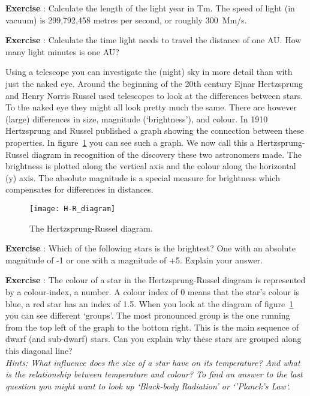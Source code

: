 \begin{shaded}
\textbf{Exercise \theExercise {}} : Calculate the length of the light year in Tm. The speed of light (in vacuum) is 299,792,458 metres per second, or roughly 300~Mm/s.\end{shaded}
\begin{shaded}
\textbf{Exercise \theExercise {}} : Calculate the time light needs to travel the distance of one AU. How many light minutes is one AU?\end{shaded}

Using a telescope you can investigate the (night) sky in more detail than with just the naked eye. Around the beginning of the 20th century Ejnar Hertzsprung and Henry Norris Russel used telescopes to look at the differences between stars. To the naked eye they might all look pretty much the same. There are however (large) differences in size, magnitude (`brightness'), and colour. In 1910 Hertzsprung and Russel published a graph showing the connection between these properties. In figure~\ref{fig:hertzsprung} you can see such a graph. We now call this a Hertzsprung-Russel diagram in recognition of the discovery these two astronomers made. The brightness is plotted along the vertical axis and the colour along the horizontal (y) axis. The absolute magnitude is a special measure for brightness which compensates for differences in distances.
\begin{figure}\begin{center}
\texttt{[image: H-R\_diagram]}%
\caption{The Hertzsprung-Russel diagram.}\label{fig:hertzsprung}
\end{center}\end{figure}

\begin{shaded}
\textbf{Exercise \theExercise {}} : Which of the following stars is the brightest? One with an absolute magnitude of -1 or one with a magnitude of +5. Explain your answer.\end{shaded}
\begin{shaded}
\textbf{Exercise \theExercise {}} : The colour of a star in the Hertzsprung-Russel diagram is represented by a colour-index, a number. A colour index of 0 means that the star's colour is blue, a red star has an index of 1.5. When you look at the diagram of figure~\ref{fig:hertzsprung} you can see different `groups'. The most pronounced group is the one running from the top left of the graph to the bottom right. This is the main sequence of dwarf (and sub-dwarf) stars. Can you explain why these stars are grouped along this diagonal line?\\ \textit{Hints: What influence does the size of a star have on its temperature? And what is the relationship between temperature and colour? To find an answer to the last question you might want to look up `Black-body Radiation' or `'Planck's Law`.}\end{shaded}

